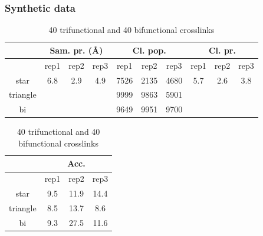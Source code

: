 \documentclass[a4paper,8pt]{beamer}
\begin{document}
\begin{frame}
  \frametitle{Synthetic data}
  \begin{table}[htbp]
    \centering
    \caption{40 trifunctional and 40 bifunctional crosslinks}
    \begin{tabular}{|c|ccc|ccc|ccc|}
        \hline
        & \multicolumn{3}{c|}{Sam. pr. ({\AA})} 
        & \multicolumn{3}{c|}{Cl. pop.} 
        & \multicolumn{3}{c|}{Cl. pr.} \\ \hline
        & rep1 & rep2 & rep3 
        & rep1 & rep2 & rep3 
        & rep1 & rep2 & rep3 \\ \hline
        star 
          & 6.8 & 2.9 & 4.9  
          & 7526  & 2135 & 4680
          & 5.7 & 2.6 & 3.8\\ \hline
        triangle 
          &  &  &  
          & 9999 & 9863 & 5901  
          &   &  &  \\ \hline
        bi 
          &  &  &   
          & 9649 & 9951 & 9700 
          &  &  &   \\ \hline
    \end{tabular}
  \end{table}
  \begin{table}[htbp]
    \centering
    \caption{40 trifunctional and 40 bifunctional crosslinks}
    \begin{tabular}{|c|ccc|}
        \hline 
        & \multicolumn{3}{c|}{Acc.} \\ \hline
        & rep1 & rep2 & rep3 \\ \hline
        star 
          &  9.5 & 11.9 & 14.4 \\ \hline
        triangle 
          & 8.5 & 13.7 & 8.6 \\ \hline
        bi 
          & 9.3 & 27.5 & 11.6 \\ \hline
    \end{tabular}
  \end{table}
  \end{frame}
\end{document}
